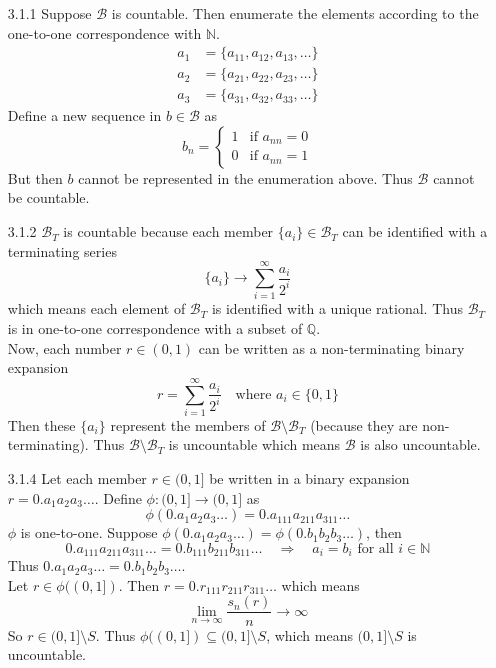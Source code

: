 \documentclass[../../Solutions.tex]{subfiles}
\begin{document}
\begin{itemize}
	\item [3.1.1] Suppose $\mathcal{B}$ is countable.
		Then enumerate the elements according to the one-to-one correspondence with $\mathbb{N}$.
		\begin{equation*} \begin{split}
			a_1 & = \{a_{11},a_{12},a_{13},\dots\} \\
			a_2 & = \{a_{21},a_{22},a_{23},\dots\} \\
			a_3 & = \{a_{31},a_{32},a_{33},\dots\}
		\end{split} \end{equation*}
		Define a new sequence in $b \in \mathcal{B}$ as
		\begin{equation*} b_n = \begin{cases}
			1 & \text{if } a_{nn} = 0 \\
			0 & \text{if } a_{nn} = 1
		\end{cases} \end{equation*}
		But then $b$ cannot be represented in the enumeration above.
		Thus $\mathcal{B}$ cannot be countable.
	
	\item  [3.1.2] $\mathcal{B}_T$ is countable because each member $\{a_i\} \in \mathcal{B}_T$ can be identified with a terminating series
		$$ \{a_i\} \to \sum_{i=1}^\infty \frac{a_i}{2^i} $$
		which means each element of $\mathcal{B}_T$ is identified with a unique rational.
		Thus $\mathcal{B}_T$ is in one-to-one correspondence with a subset of $\mathbb{Q}$. \\
		Now, each number $r \in (0,1)$ can be written as a non-terminating binary expansion
		$$ r = \sum_{i=1}^\infty \frac{a_i}{2^i} \quad\text{where } a_i \in \{0,1\} $$
		Then these $\{a_i\}$ represent the members of $\mathcal{B}\setminus\mathcal{B}_T$ (because they are non-terminating).
		Thus $\mathcal{B}\setminus\mathcal{B}_T$ is uncountable which means $\mathcal{B}$ is also uncountable.
	
	\item [3.1.4] Let each member $r \in (0,1]$ be written in a binary expansion $r = 0.a_1a_2a_3\dots$.
		Define $\phi:(0,1]\to(0,1]$ as
		$$ \phi(0.a_1a_2a_3\dots) = 0.a_111a_211a_311\dots $$
		$\phi$ is one-to-one. Suppose $\phi(0.a_1a_2a_3\dots) = \phi(0.b_1b_2b_3\dots)$, then
		$$ 0.a_111a_211a_311\dots = 0.b_111b_211b_311\dots \quad\Longrightarrow\quad a_i = b_i \text{ for all } i \in \mathbb{N} $$
		Thus $0.a_1a_2a_3\dots = 0.b_1b_2b_3\dots$. \\
		Let $r \in \phi((0,1])$. Then $r = 0.r_111r_211r_311\dots$ which means
		$$ \lim_{n\to\infty} \frac{s_n(r)}{n} \to \infty $$
		So $r \in (0,1]\setminus S$.
		Thus $\phi((0,1]) \subseteq (0,1]\setminus S$, which means $(0,1]\setminus S$ is uncountable.
	

\end{itemize}
\end{document}
